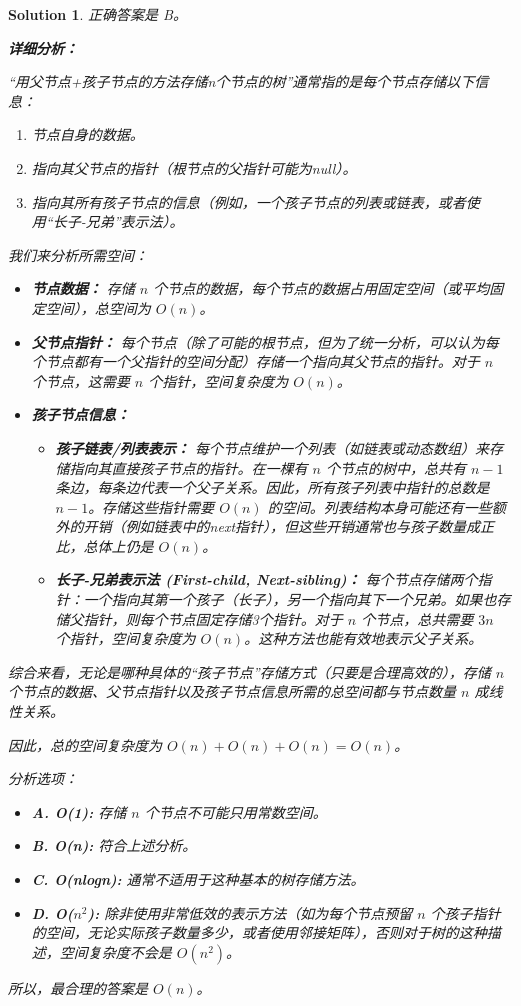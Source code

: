 \documentclass[UTF8]{report}
\newtheorem{solution}{Solution}
\theoremstyle{MyLineTheoremStyle} %
\theoremstyle{MyBlockTheoremStyle} %
\theoremstyle{MySubsubsectionStyle} %
\begin{document}
\begin{solution}
正确答案是 B。

\textbf{详细分析：}

“用父节点+孩子节点的方法存储n个节点的树”通常指的是每个节点存储以下信息：
\begin{enumerate}
    \item 节点自身的数据。
    \item 指向其父节点的指针（根节点的父指针可能为null）。
    \item 指向其所有孩子节点的信息（例如，一个孩子节点的列表或链表，或者使用“长子-兄弟”表示法）。
\end{enumerate}

我们来分析所需空间：
\begin{itemize}
    \item \textbf{节点数据：} 存储 $n$ 个节点的数据，每个节点的数据占用固定空间（或平均固定空间），总空间为 $O(n)$。
    \item \textbf{父节点指针：} 每个节点（除了可能的根节点，但为了统一分析，可以认为每个节点都有一个父指针的空间分配）存储一个指向其父节点的指针。对于 $n$ 个节点，这需要 $n$ 个指针，空间复杂度为 $O(n)$。
    \item \textbf{孩子节点信息：}
        \begin{itemize}
            \item \textbf{孩子链表/列表表示：} 每个节点维护一个列表（如链表或动态数组）来存储指向其直接孩子节点的指针。在一棵有 $n$ 个节点的树中，总共有 $n-1$ 条边，每条边代表一个父子关系。因此，所有孩子列表中指针的总数是 $n-1$。存储这些指针需要 $O(n)$ 的空间。列表结构本身可能还有一些额外的开销（例如链表中的next指针），但这些开销通常也与孩子数量成正比，总体上仍是 $O(n)$。
            \item \textbf{长子-兄弟表示法 (First-child, Next-sibling)：} 每个节点存储两个指针：一个指向其第一个孩子（长子），另一个指向其下一个兄弟。如果也存储父指针，则每个节点固定存储3个指针。对于 $n$ 个节点，总共需要 $3n$ 个指针，空间复杂度为 $O(n)$。这种方法也能有效地表示父子关系。
        \end{itemize}
\end{itemize}

综合来看，无论是哪种具体的“孩子节点”存储方式（只要是合理高效的），存储 $n$ 个节点的数据、父节点指针以及孩子节点信息所需的总空间都与节点数量 $n$ 成线性关系。

因此，总的空间复杂度为 $O(n) + O(n) + O(n) = O(n)$。

分析选项：
\begin{itemize}
    \item \textbf{A. O(1):} 存储 $n$ 个节点不可能只用常数空间。
    \item \textbf{B. O(n):} 符合上述分析。
    \item \textbf{C. O(nlogn):} 通常不适用于这种基本的树存储方法。
    \item \textbf{D. O($n^2$):} 除非使用非常低效的表示方法（如为每个节点预留 $n$ 个孩子指针的空间，无论实际孩子数量多少，或者使用邻接矩阵），否则对于树的这种描述，空间复杂度不会是 $O(n^2)$。
\end{itemize}

所以，最合理的答案是 $O(n)$。
\end{solution}
\end{document}
